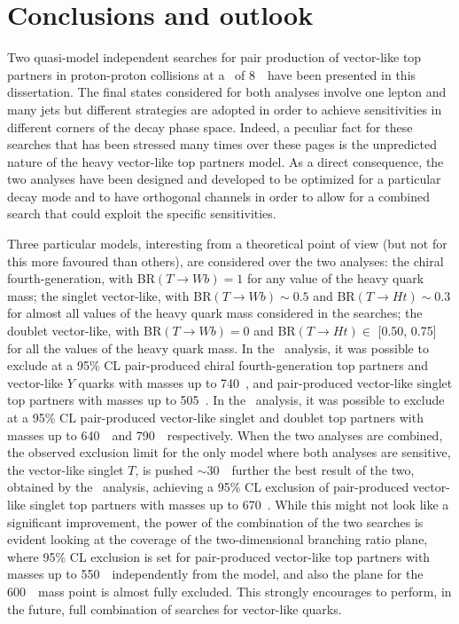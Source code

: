 \clearpage{\pagestyle{empty}\cleardoublepage}

\chapter*{Conclusions and outlook}\label{chap:conclusions}

\vskip-1.5cm

Two quasi-model independent searches for 
pair production of vector-like top partners 
in proton-proton collisions at a \cme\ of 8~\tev\ 
have been presented in this dissertation. The final states considered
for both analyses involve one lepton and many jets but different
strategies are adopted in order to achieve sensitivities in different
corners of the decay phase space. Indeed, a peculiar fact for these
searches that has been stressed many times over these pages is the 
unpredicted nature of the heavy vector-like top partners model. 
As a direct consequence, the two analyses have been designed
and developed to be optimized for a particular decay mode and
to have orthogonal channels in order to allow
for a combined search that could exploit the specific sensitivities.

Three particular models, interesting from a theoretical point
of view (but not for this more favoured than others), are considered
over the two analyses: the chiral fourth-generation, with 
BR$(T\to Wb)=1$ for any value of the heavy quark mass; 
the singlet vector-like, with BR$(T\to Wb)\sim 0.5$ and 
BR$(T\to Ht)\sim 0.3$ for almost all
values of the heavy quark mass considered in the searches;
the doublet vector-like, with BR$(T\to Wb)= 0$ and 
BR$(T\to Ht)\in$ [0.50, 0.75] for all the values of the heavy quark mass.
In the \wbx\ analysis, it was possible to exclude at a 95\% CL
pair-produced chiral fourth-generation top partners and vector-like
$Y$ quarks with masses up to 740~\gev, and pair-produced vector-like 
singlet top partners with  masses up to 505~\gev.
In the \htx\ analysis, it was possible to exclude at a 95\% CL
pair-produced vector-like singlet and doublet top partners with 
masses up to 640~\gev\ and 790~\gev\ respectively.
When the two analyses are combined, the observed exclusion limit
for the only model where both analyses are sensitive, the
vector-like singlet $T$, is pushed $\sim$30~\gev\ further the
best result of the two, obtained by the \htx\ analysis,
achieving a 95\% CL exclusion of pair-produced vector-like singlet 
top partners with masses up to 670~\gev. While this might not
look like a significant improvement, the power of the combination
of the two searches is evident looking at the coverage of the
two-dimensional branching ratio plane, where  95\% CL exclusion is set for
pair-produced vector-like top partners with masses up to 550~\gev\ 
independently from the model, and also the plane for the 600~\gev\ mass
point is almost fully excluded. This strongly encourages to perform,
in the future, full combination of searches for vector-like quarks.

